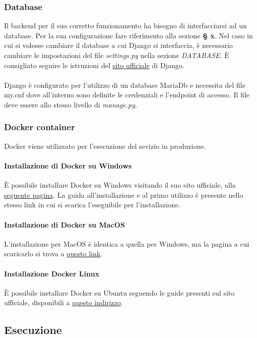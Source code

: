 \subsubsection{Database}
Il backend per il suo corretto funzionamento ha bisogno di interfacciarsi ad un database. Per la sua configurazione fare riferimento alla sezione \textbf{§ x}.
Nel caso in cui si volesse cambiare il database a cui Django si interfaccia, è necessario cambiare le impostazioni del file \textit{settings.py} nella sezione \textit{DATABASE}. È consigliato seguire le istruzioni del \href{https://docs.djangoproject.com/en/3.2/ref/databases/}{sito ufficiale} di Django.
\\
\\
Django è configurato per l'utilizzo di un database MariaDb e necessita del file my.cnf dove all'interno sono definite le credenziali e l'endpoint di accesso. Il file deve essere allo stesso livello di \textit{manage.py}.

\subsubsection{Docker container}
Docker viene utilizzato per l'esecuzione del sevizio in produzione.
\paragraph{Installazione di Docker su Windows}
È possibile installare Docker su Windows visitando il suo sito ufficiale, alla \href{https://hub.docker.com/editions/community/docker-ce-desktop-windows}{seguente pagina}. La guida all'installazione e al primo utilizzo è presente nello stesso link in cui si scarica l'eseguibile per l'installazione.
\paragraph{Installazione di Docker su MacOS}
L'installazione per MacOS è identica a quella per Windows, ma la pagina a cui scaricarlo si trova a \href{https://hub.docker.com/editions/community/docker-ce-desktop-mac}{questo link}.
\paragraph{Installazione Docker Linux}
È possibile installare Docker su Ubuntu seguendo le guide presenti sul sito ufficiale, disponibili a \href{https://docs.docker.com/engine/install/ubuntu/}{questo indirizzo}.

\subsection{Esecuzione}